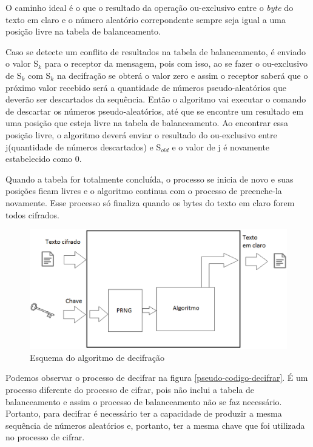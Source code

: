 O caminho ideal é o que o resultado da operação ou-exclusivo entre o \textit{byte} do texto em claro e o número aleatório correpondente sempre seja igual a uma posição livre na tabela de balanceamento.

Caso se detecte um conflito de resultados na tabela de balanceamento, é enviado o valor S$_k$ para o receptor da mensagem, pois com isso, ao se fazer o ou-exclusivo de S$_k$ com S$_k$ na decifração se obterá o valor zero e assim o receptor saberá que o próximo valor recebido será a quantidade de números pseudo-aleatórios que deverão ser descartados da sequência. Então o algoritmo vai executar o comando de descartar os números pseudo-aleatórios, até que se encontre um resultado em uma posição que esteja livre na tabela de balanceamento. Ao encontrar essa posição livre, o algoritmo deverá enviar o resultado do ou-exclusivo entre j(quantidade de números descartados) e S$_{old}$ e o valor de j é novamente estabelecido como 0.

Quando a tabela for totalmente concluída, o processo se inicia de novo e suas posições ficam livres e o algoritmo continua com o processo de preenche-la novamente. Esse processo só finaliza quando os bytes do texto em claro forem todos cifrados. 

\begin{figure}[h]
	\centering
	\includegraphics[scale=0.6]{figuras/metodo_de_decifra.eps}
	\caption{Esquema do algoritmo de decifração}
\end{figure}

Podemos observar o processo de decifrar na figura \ref{pseudo-codigo-decifrar}. É um processo diferente do processo de cifrar, pois não inclui a tabela de balanceamento e assim o processo de balanceamento não se faz necessário. Portanto, para decifrar é necessário ter a capacidade de produzir a mesma sequência de números aleatórios e, portanto, ter a mesma chave que foi utilizada no processo de cifrar. 


